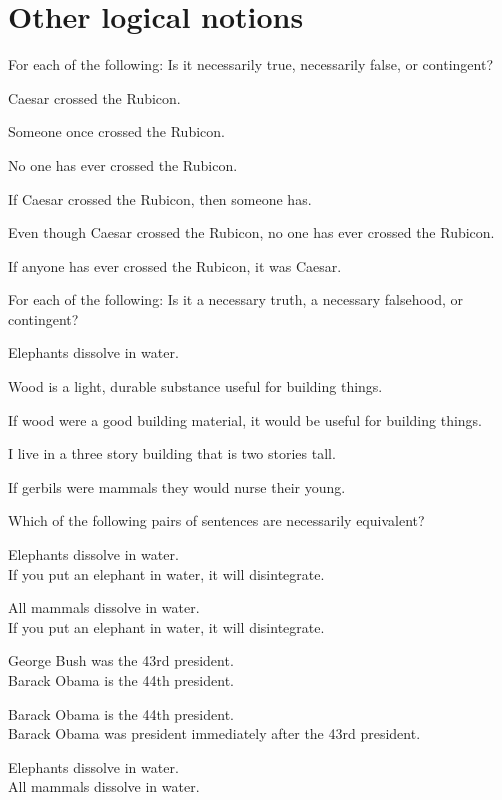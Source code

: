 \chapter{Other logical notions}
\setcounter{ProbPart}{0}
\problempart
\label{pr.EnglishTautology}
For each of the following: Is it necessarily true, necessarily false, or contingent?
\begin{compactlist}
\item Caesar crossed the Rubicon.
\hfill {}
\item Someone once crossed the Rubicon.
\hfill {}
\item No one has ever crossed the Rubicon.
\hfill {}
\item If Caesar crossed the Rubicon, then someone has.
\hfill {}
\item Even though Caesar crossed the Rubicon, no one has ever crossed the Rubicon.
\hfill {}
\item If anyone has ever crossed the Rubicon, it was Caesar.
\hfill {}
\end{compactlist}

\problempart
For each of the following: Is it a necessary truth, a necessary falsehood, or contingent?
\begin{compactlist}
\item Elephants dissolve in water.
\item Wood is a light, durable substance useful for building things.
\item If wood were a good building material, it would be useful for building things.
\item I live in a three story building that is two stories tall.
\item If gerbils were mammals they would nurse their young.
\end{compactlist}

\problempart Which of the following pairs of sentences are necessarily  equivalent? 

\begin{compactlist}
\item Elephants dissolve in water.	\\
	If you put an elephant in water, it will disintegrate.
\item All mammals dissolve in water.\\		
	If you put an elephant in water, it will disintegrate.
\item George Bush was the 43rd president. \\
	 Barack Obama is the 44th president.
\item Barack Obama is the 44th president. \\
	  Barack Obama was president immediately after the 43rd president.
\item Elephants dissolve in water. 	\\	
	All mammals dissolve in water.
\end{compactlist}

